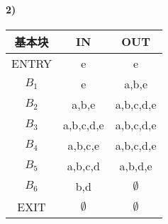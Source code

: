 \documentclass[11pt]{article}
\begin{document}
\paragraph{2)}
\begin{tabular}{|c|c|c|}
	\hline
	\textbf{基本块} & \textbf{IN} & \textbf{OUT} \\ \hline
	ENTRY & e & e  \\ \hline
	$B_1$ & e & a,b,e \\ \hline
	$B_2$ & a,b,e & a,b,c,d,e \\ \hline
	$B_3$ & a,b,c,d,e & a,b,c,d,e \\ \hline
	$B_4$ & a,b,c,e & a,b,c,d,e \\ \hline
	$B_5$ & a,b,c,d & a,b,d,e \\ \hline
	$B_6$ & b,d & $\emptyset$ \\ \hline
	EXIT & $\emptyset$ & $\emptyset$ \\ \hline
\end{tabular}
\end{document}

